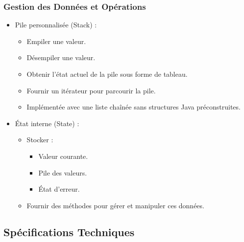 \documentclass[12pt]{report}
\begin{document}
            \subsubsection*{Gestion des Données et Opérations}
                \begin{itemize}
                    \item Pile personnalisée (Stack) :
                    \begin{itemize}
                        \item Empiler une valeur.
                        \item Désempiler une valeur.
                        \item Obtenir l’état actuel de la pile sous forme de tableau.
                        \item Fournir un itérateur pour parcourir la pile.
                        \item Implémentée avec une liste chaînée sans structures Java préconstruites.
                    \end{itemize}

                    \item État interne (State) :
                    \begin{itemize}
                        \item Stocker :
                        \begin{itemize}
                            \item Valeur courante.
                            \item Pile des valeurs.
                            \item État d’erreur.
                        \end{itemize}

                        \item Fournir des méthodes pour gérer et manipuler ces données.
                    \end{itemize}
                \end{itemize}

            \subsection*{Spécifications Techniques}
\end{document}
